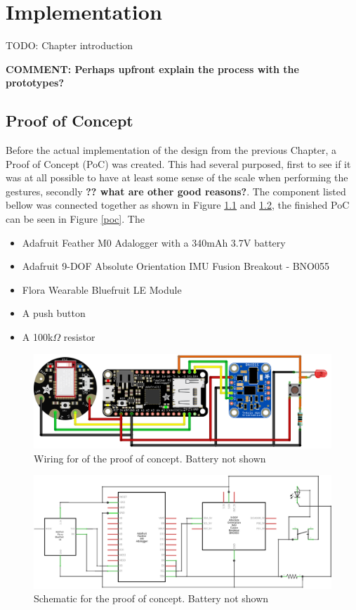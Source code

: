 \chapter{Implementation}

TODO: Chapter introduction

\textbf{COMMENT: Perhaps upfront explain the process with the prototypes?}

\section{Proof of Concept}
Before the actual implementation of the design from the previous Chapter, a Proof of Concept (PoC) was created. This had several purposed, first to see if it was at all possible to have at least some sense of the scale when performing the gestures, secondly \textbf{?? what are other good reasons?}. The component listed bellow was connected together as shown in Figure \ref{sketch_bb} and \ref{sketch_schem}, the finished PoC can be seen in Figure \ref{poc}. The 

\begin{itemize}
    \item Adafruit Feather M0 Adalogger\cite{adalogger} with a 340mAh 3.7V battery
    \item Adafruit 9-DOF Absolute Orientation IMU Fusion Breakout - BNO055\cite{gyro}
	\item Flora Wearable Bluefruit LE Module\cite{bluefruit}
	\item A push button
	\item A 100k$\Omega$ resistor
\end{itemize}

\begin{figure}[h!]
    \centering
    \includegraphics[width=1\textwidth]{figures/Sketch_bb.png}
    \caption{Wiring for of the proof of concept. Battery not shown}
    \label{sketch_bb}
\end{figure}

\begin{figure}[h!]
    \centering
    \includegraphics[width=1\textwidth]{figures/Sketch_schem.png}
    \caption{Schematic for the proof of concept. Battery not shown}
    \label{sketch_schem}
\end{figure}

